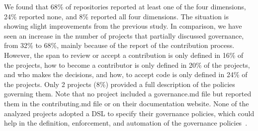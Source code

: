 We found that 68\% of repositories reported at least one of the four dimensions, 24\% reported none, and 8\% reported all four dimensions. %
The situation is showing slight improvements from the previous study.
In comparison, we have seen an increase in the number of projects that partially discussed governance, from 32\% to 68\%, mainly because of the report of the contribution process.
However, the span to review or accept a contribution is only defined in 16\% of the projects, how to become a contributor is only defined in 20\% of the projects, and who makes the decisions, and how, to accept code is only defined in 24\% of the projects.
Only 2 projects (8\%) provided a full description of the policies governing them. %
Note that no project included a governance.md file but reported them in the contributing.md file or on their documentation website.
None of the analyzed projects adopted a DSL to specify their governance policies, which could help in the definition, enforcement, and automation of the governance policies~\cite{DBLP:journals/cacm/IzquierdoC23}.
